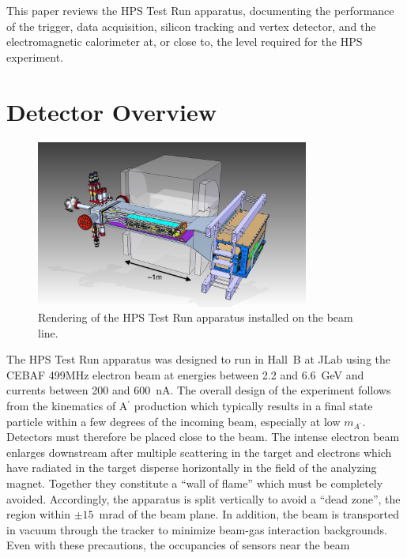 \documentclass[final,3p,times,twocolumn]{elsarticle}
\newcommand{\Aprime}{A\ensuremath{^\prime}}
\begin{document}
This paper reviews the HPS Test Run apparatus, documenting the performance of the trigger, 
data acquisition, silicon tracking and vertex detector, and the electromagnetic calorimeter at, or close 
to, the level required for the HPS experiment. 





\section{Detector Overview}
\label{detector}
{\small
\begin{figure}[t]
\begin{center}
    \includegraphics[width=0.8\textwidth]{hps_testrun_rendering_2.jpg}
\caption{Rendering of the HPS Test Run apparatus installed on the beam line.
\label{fig:testrundetector}}
\end{center}
\end{figure}
}
The HPS Test Run apparatus was designed to run in Hall~B at JLab using the CEBAF 499MHz 
electron beam at energies between 2.2 and 6.6~GeV and currents between 200 and 600~nA.  
The overall design of the experiment follows from the kinematics of \Aprime{} production which 
typically results in a final state particle within a few degrees of the incoming beam, especially at low 
$m_{\Aprime{}}$. Detectors must therefore be placed close to the beam. 
The intense electron beam enlarges downstream after multiple scattering in the target and electrons 
which have radiated in the target disperse horizontally in the field of the analyzing magnet. Together 
they constitute a ``wall of flame'' which must be completely avoided. Accordingly, 
the apparatus is split vertically to avoid a ``dead zone'', the region within $\pm 15$~mrad of the beam 
plane. In addition, the beam is transported in vacuum through the tracker to minimize beam-gas 
interaction backgrounds. Even with these precautions, the occupancies of sensors near the beam 
\end{document}
